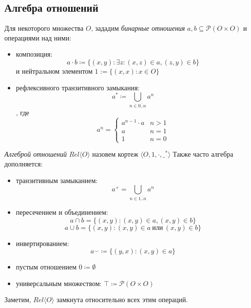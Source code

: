 \documentclass[times
              ]{itmo-student-thesis}
\begin{document}
    \subsection{Алгебра отношений}
      Для некоторого множества $ O $, зададим \textit{бинарные отношения}
      $ a, b \subseteq \mathcal{P}(O \times O) $
      и операциями над ними:
      \begin{itemize}
        \item композиция:
         $$a \cdot b \coloneqq
        \{ (x, y) : \exists z : (x, z) \in a, (z, y) \in b \} $$
        и нейтральном элементом $ 1 := \{(x, x) : x \in O\}$
        \item рефлексивного транзитивного замыкания:
        $$ a^* \coloneqq \bigcup\limits_{n \in \overline{0..n}} a^n $$,
       где
       \begin{equation*}
        a^n = \begin{cases}
          a^{n-1} \cdot a & n > 1\\
          a               & n = 1\\
          1               & n = 0
        \end{cases}
       \end{equation*}
      \end{itemize}

      \textit{Алгеброй отношений} $\mathit{Rel}\langle O \rangle$
      назовем кортеж  $\langle O, 1, \cdot, \_^* \rangle $
      Также часто алгебра дополняется:
      \begin{itemize}
        \item транзитивным замыканием:
        $$ a^+ = \bigcup\limits_{n \in \overline{1..n}} a^n $$
        \item пересечением и объединением:
        $$ a \cap b = \{(x, y) : (x, y) \in a, (x, y) \in b \} $$
        $$ a \cup b = \{(x, y) : (x, y) \in a ~\text{или}~ (x, y) \in b   \} $$
        \item инвертированием:
         $$ a^\smile \coloneqq \{ (y, x): (x, y) \in a \} $$
        \item пустым отношением $ 0 \coloneqq \emptyset $
        \item универсальным множеством: $ \top \coloneqq \mathcal{P}(O \times O) $
      \end{itemize}

      Заметим, $ \mathit{Rel} \langle O \rangle $ замкнута относительно всех этим операций.
\end{document}
